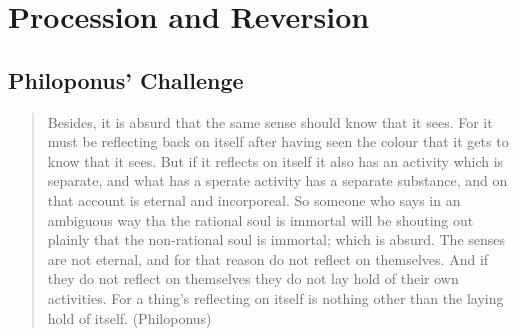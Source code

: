\chapter{Procession and Reversion} %
\label{cha:procession}

\section{Philoponus' Challenge} %
\label{sec:philoponus_challenge}

\begin{quote}
	Besides, it is absurd that the same sense should know that it sees. For it must be reflecting back on itself after having seen the colour that it gets to know that it sees. But if it reflects on itself it also has an activity which is separate, and what has a sperate activity has a separate substance, and on that account is eternal and incorporeal. So someone who says in an ambiguous way tha the rational soul is immortal will be shouting out plainly that the non-rational soul is immortal; which is absurd. The senses are not eternal, and for that reason do not reflect on themselves. And if they do not reflect on themselves they do not lay hold of their own activities. For a thing's reflecting on itself is nothing other than the laying hold of itself. (Philoponus)
\end{quote}




